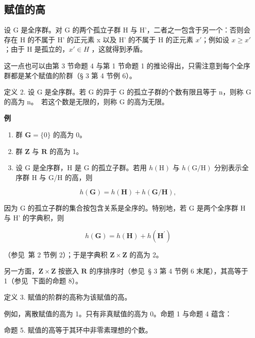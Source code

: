 \subsection{赋值的高}

设 G 是全序群。对 G 的两个孤立子群 H 与 H'，二者之一包含于另一个：否则会存在 H 的不属于 H' 的正元素 x 以及 H' 的不属于 H 的正元素 \(x'\)；例如设 \(x \geqslant x'\) ；由于 H 是孤立的，\(x' \in H\) ，这就得到矛盾。

这一点也可以由第 3 节命题 4 与第 1 节命题 1 的推论得出，只需注意到每个全序群都是某个赋值的阶群（§ 3 第 4 节例 6）。

定义 2. 设 G 是全序群。若 G 的异于 G 的孤立子群的个数有限且等于 n，则称 G 的高为 n。~若这个数是无限的，则称 G 的高为无限。

\textbf{例}\par

\begin{enumerate}
\def\labelenumi{(\arabic{enumi})}
\item
  群 \(\mathbf{G} = \{0\}\) 的高为 0。
\item
  群 \(\mathbf{Z}\) 与 \(\mathbf{R}\) 的高为 1。
\item
  设 G 是全序群，H 是 G 的孤立子群。若用 \(h(\mathrm{H})\) 与 \(h(\mathrm{G}/\mathrm{H})\) 分别表示全序群 H 与 G/H 的高，则
\end{enumerate}

\[
h (\mathbf {G}) = h (\mathbf {H}) + h (\mathbf {G} / \mathbf {H}),\tag{2}
\]

因为 G 的孤立子群的集合按包含关系是全序的。特别地，若 G 是两个全序群 H 与 H' 的字典积，则

\[
h (\mathbf {G}) = h (\mathbf {H}) + h \left(\mathbf {H} ^ {\prime}\right)\tag{3}
\]

（参见~第 2 节例 2）；于是字典积 \(\mathbf{Z} \times \mathbf{Z}\) 的高为 2。

另一方面，\(\mathbf{Z} \times \mathbf{Z}\) 按嵌入 \(\mathbf{R}\) 的序排序时（参见~§ 3 第 4 节例 6 末尾），其高等于 1（参见~下面的命题 8）。

定义 3. 赋值的阶群的高称为该赋值的高。

例如，离散赋值的高为 1。只有非真赋值的高为 0。命题 1 与命题 4 蕴含：

命题 5. 赋值的高等于其环中非零素理想的个数。

